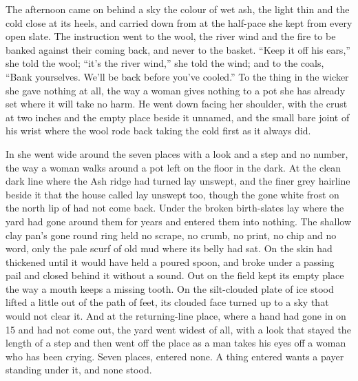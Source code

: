 The afternoon came on behind a sky the colour of wet ash, the light thin and the cold close at its heels, and  carried  down from  at the half-pace she kept from every open slate. The instruction went to the wool, the river wind and the fire to be banked against their coming back, and never to the basket. “Keep it off his ears,” she told the wool; “it's the river wind,” she told the wind; and to the coals, “Bank yourselves. We'll be back before you've cooled.” To the thing in the wicker she gave nothing at all, the way a woman gives nothing to a pot she has already set where it will take no harm. He went down facing her shoulder, with the crust at two inches and the empty place beside it unnamed, and the small bare joint of his wrist where the wool rode back taking the cold first as it always did.

In  she went wide around the seven places with a look and a step and no number, the way a woman walks around a pot left on the floor in the dark. At  the clean dark line where the Ash ridge had turned lay unswept, and the finer grey hairline beside it that the house called  lay unswept too, though the gone white frost on the north lip of  had not come back. Under  the broken birth-slates lay where the yard had gone around them for years and entered them into nothing. The shallow clay pan's gone round ring held no scrape, no crumb, no print, no chip and no word, only the pale scurf of old mud where its belly had sat. On  the skin had thickened until it would have held a poured spoon, and broke under a passing pail and closed behind it without a sound. Out on  the field kept its empty place the way a mouth keeps a missing tooth. On  the silt-clouded plate of ice stood lifted a little out of the path of feet, its clouded face turned up to a sky that would not clear it. And at the returning-line place, where a hand had gone in on  15 and had not come out, the yard went widest of all, with a look that stayed the length of a step and then went off the place as a man takes his eyes off a woman who has been crying. Seven places, entered none. A thing entered wants a payer standing under it, and none stood.

